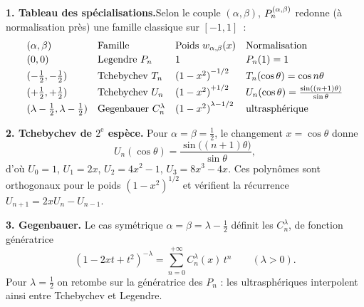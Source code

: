 \begin{mdframed}[style=exbar]
  \textbf{1. Tableau des spécialisations.}\enspace Selon le couple
  $(\alpha,\beta)$, $P_n^{(\alpha,\beta)}$ redonne (à normalisation près) une famille
  classique sur $[-1,1]$~:
  \[
    \begin{array}{llll}
      (\alpha,\beta) & \text{Famille} & \text{Poids } w_{\alpha,\beta}(x) & \text{Normalisation}\\[2pt]
      (0,0)            & \text{Legendre } P_n & 1 & P_n(1)=1\\[2pt]
      (-\tfrac12,-\tfrac12) & \text{Tchebychev } T_n & {(1-x^2)}^{-1/2} & T_n(\cos\theta)=\cos n\theta\\[2pt]
      (+\tfrac12,+\tfrac12) & \text{Tchebychev } U_n & {(1-x^2)}^{+1/2} & U_n(\cos\theta)=\tfrac{\sin((n+1)\theta)}{\sin\theta}\\[2pt]
      (\lambda-\tfrac12,\lambda-\tfrac12) & \text{Gegenbauer } C_n^{\lambda} & {(1-x^2)}^{\lambda-1/2} & \text{ultrasphérique}
    \end{array}
  \]

  \smallskip\noindent
  \textbf{2. Tchebychev de $2^{\text{e}}$ espèce.}\enspace
  Pour $\alpha=\beta=\tfrac12$, le changement $x=\cos\theta$ donne
  \[
    U_n(\cos\theta)=\frac{\sin\bigl((n+1)\theta\bigr)}{\sin\theta},
  \]
  d'où $U_0=1$, $U_1=2x$, $U_2=4x^2-1$, $U_3=8x^3-4x$. Ces polynômes sont
  orthogonaux pour le poids ${(1-x^2)}^{1/2}$ et vérifient la récurrence
  $U_{n+1}=2xU_n-U_{n-1}$.

  \smallskip\noindent
  \textbf{3. Gegenbauer.}\enspace{}
  Le cas symétrique $\alpha=\beta=\lambda-\tfrac12$ définit les
  $C_n^{\lambda}$, de fonction génératrice
  \[
    {(1-2xt+t^2)}^{-\lambda}=\sum_{n=0}^{+\infty}C_n^{\lambda}(x)\,t^n
    \qquad (\lambda>0).
  \]
  Pour $\lambda=\tfrac12$ on retombe sur la génératrice des $P_n$ : les
  ultrasphériques interpolent ainsi entre
  Tchebychev et Legendre.
\end{mdframed}

\vspace{6pt}

